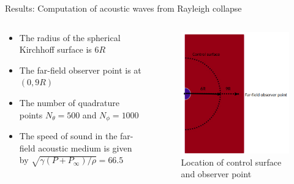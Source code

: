 \documentclass[10pt, aspectratio=169]{beamer}
\begin{document}
\begin{frame}{Results: Computation of acoustic waves from Rayleigh collapse}
							
	\begin{columns}
		\begin{column}{0.45\textwidth}
			\begin{itemize}
				\item The radius of the spherical Kirchhoff surface is $6R$
				\item The far-field observer point is at $(0, 9R)$ 
				\item The number of quadrature points $N_{\theta} = 500$ and $N_{\phi} = 1000$
				\item The speed of sound in the far-field acoustic medium is given by $\sqrt{\gamma(P + P_{\infty})/\rho} = 66.5$	
			\end{itemize}
		\end{column}
																																			
		\begin{column}{0.46\textwidth}
			\begin{figure}
				\centering
				\includegraphics[scale=0.28]{images/schematic3.png}
				\caption{Location of control surface and observer point}
			\end{figure}
		\end{column}
														
	\end{columns}
\end{frame}
\end{document}
